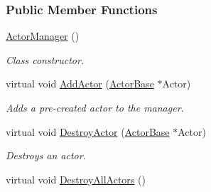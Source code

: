 \subsubsection*{Public Member Functions}
\begin{DoxyCompactItemize}
\item 
\hypertarget{classMezzanine_1_1ActorManager_aa9074e3c8dd87865e957c4d76fbc5e25}{
\hyperlink{classMezzanine_1_1ActorManager_aa9074e3c8dd87865e957c4d76fbc5e25}{ActorManager} ()}
\label{classMezzanine_1_1ActorManager_aa9074e3c8dd87865e957c4d76fbc5e25}

\begin{DoxyCompactList}\small\item\em Class constructor. \item\end{DoxyCompactList}\item 
virtual void \hyperlink{classMezzanine_1_1ActorManager_af801d07590853b3ae0c52574a340ea44}{AddActor} (\hyperlink{classMezzanine_1_1ActorBase}{ActorBase} $\ast$Actor)
\begin{DoxyCompactList}\small\item\em Adds a pre-\/created actor to the manager. \item\end{DoxyCompactList}\item 
virtual void \hyperlink{classMezzanine_1_1ActorManager_a7885890ba7a33c0d904728858379e201}{DestroyActor} (\hyperlink{classMezzanine_1_1ActorBase}{ActorBase} $\ast$Actor)
\begin{DoxyCompactList}\small\item\em Destroys an actor. \item\end{DoxyCompactList}\item 
\hypertarget{classMezzanine_1_1ActorManager_ac71886ad26a513d1b53f0e2d6049539c}{
virtual void \hyperlink{classMezzanine_1_1ActorManager_ac71886ad26a513d1b53f0e2d6049539c}{DestroyAllActors} ()}
\label{classMezzanine_1_1ActorManager_ac71886ad26a513d1b53f0e2d6049539c}


\end{DoxyCompactItemize}
